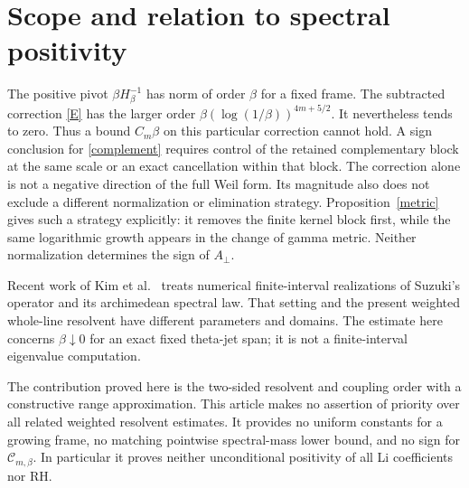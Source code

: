 \documentclass[11pt]{article}
\theoremstyle{remark}
\begin{document}
\section{Scope and relation to spectral positivity}

The positive pivot \(\beta H_\beta^{-1}\) has norm of order
\(\beta\) for a fixed frame. The subtracted correction
\eqref{E} has the larger order
\(\beta(\log(1/\beta))^{4m+5/2}\).
It nevertheless tends to zero. Thus a bound \(C_m\beta\) on this
particular correction cannot hold. A sign conclusion for
\eqref{complement} requires control of the retained complementary
block at the same scale or an exact cancellation within that block.
The correction alone is not a negative direction of the full Weil
form. Its magnitude also does not exclude a different normalization
or elimination strategy. Proposition~\ref{metric} gives such a
strategy explicitly: it removes the finite kernel block first,
while the same logarithmic growth appears in the change of gamma
metric. Neither normalization determines the sign of \(A_\perp\).

Recent work of Kim et al.\ \cite{Kim} treats numerical finite-interval
realizations of Suzuki's operator and its archimedean spectral law.
That setting and the present weighted whole-line resolvent have
different parameters and domains. The estimate here concerns
\(\beta\downarrow0\) for an exact fixed theta-jet span; it is not a
finite-interval eigenvalue computation.

The contribution proved here is the two-sided resolvent and
coupling order with a constructive range approximation. This
article makes no assertion of priority over all related weighted
resolvent estimates. It provides no uniform constants for a growing
frame, no matching pointwise spectral-mass lower bound, and no sign
for \(\mathcal C_{m,\beta}\). In particular it proves neither
unconditional positivity of all Li coefficients nor RH.
\end{document}
